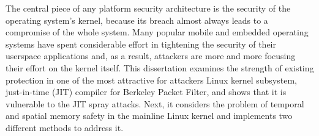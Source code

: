 The central piece of any platform security architecture is the security of the operating system's kernel, because its breach almost always leads to a compromise of the whole system. Many popular mobile and embedded operating systems have spent considerable effort in tightening the security of their userspace applications and, as a result, attackers are more and more focusing their effort on the kernel itself. This dissertation examines the strength of existing protection in one of the most attractive for attackers Linux kernel subsystem, just-in-time (JIT) compiler for Berkeley Packet Filter, and shows that it is vulnerable to the JIT spray attacks. Next, it considers the problem of temporal and spatial memory safety in the mainline Linux kernel and implements two different methods to address it.   




